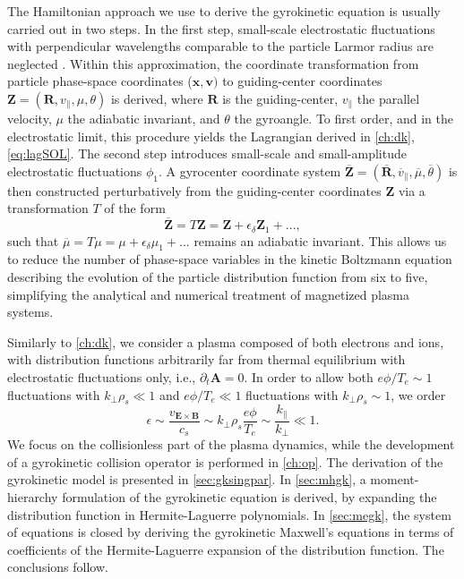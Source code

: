 The Hamiltonian approach we use to derive the gyrokinetic equation is usually carried out in two steps.
%
In the first step, small-scale electrostatic fluctuations with perpendicular wavelengths comparable to the particle Larmor radius are neglected \citep{Cary2009}.
%
Within this approximation, the coordinate transformation from particle phase-space coordinates ($\mathbf x, \mathbf v)$ to guiding-center coordinates $\mathbf Z = (\mathbf R, v_\parallel, \mu, \theta)$ is derived, where $\mathbf R$ is the guiding-center, $v_\parallel$ the parallel velocity, $\mu$ the adiabatic invariant, and $\theta$ the gyroangle.
%
To first order, and in the electrostatic limit, this procedure yields the Lagrangian derived in \cref{ch:dk}, \cref{eq:lagSOL}.
%
The second step introduces small-scale and small-amplitude electrostatic fluctuations $\phi_1$.
%
A gyrocenter coordinate system $\overline{\mathbf Z}=(\overline{\mathbf R},\overline{v}_\parallel, \overline{\mu}, \overline{\theta})$ is then constructed perturbatively from the guiding-center coordinates $\mathbf Z$ via a transformation $T$ of the form
%
\begin{equation}
    \overline{\mathbf Z} = T \mathbf Z = \mathbf Z + \epsilon_\delta \mathbf Z_1 + ...,
\label{eq:gyrotransf}
\end{equation}
%
such that $\overline \mu = T \mu = \mu + \epsilon_\delta \mu_1 + ...$ remains an adiabatic invariant.
%
This allows us to reduce the number of phase-space variables in the kinetic Boltzmann equation describing the evolution of the particle distribution function from six to five, simplifying the analytical and numerical treatment of magnetized plasma systems.

Similarly to \cref{ch:dk}, we consider a plasma composed of both electrons and ions, with distribution functions arbitrarily far from thermal equilibrium with electrostatic fluctuations only, i.e., $\partial_t \mathbf A =0$.
%
In order to allow both $e \phi/T_e \sim 1$ fluctuations with $k_\perp \rho_s \ll 1$ and $e \phi/T_e \ll 1$ fluctuations with $k_\perp \rho_s\sim 1$, we order
%
\begin{equation}
    \epsilon \sim \frac{v_{\mathbf E \times \mathbf B}}{c_s} \sim k_\perp \rho_s \frac{e \phi}{T_e} \sim \frac{k_\parallel}{k_\perp} \ll 1.
\label{eq:ordering1}
\end{equation}
%
We focus on the collisionless part of the plasma dynamics, while the development of a gyrokinetic collision operator is performed in \cref{ch:op}.
%
The derivation of the gyrokinetic model is presented in \cref{sec:gksingpar}.
%
In \cref{sec:mhgk}, a moment-hierarchy formulation of the gyrokinetic equation is derived, by expanding the distribution function in Hermite-Laguerre polynomials.
%
In \cref{sec:megk}, the system of equations is closed by deriving the gyrokinetic Maxwell's equations in terms of coefficients of the Hermite-Laguerre expansion of the distribution function.
%
The conclusions follow.

